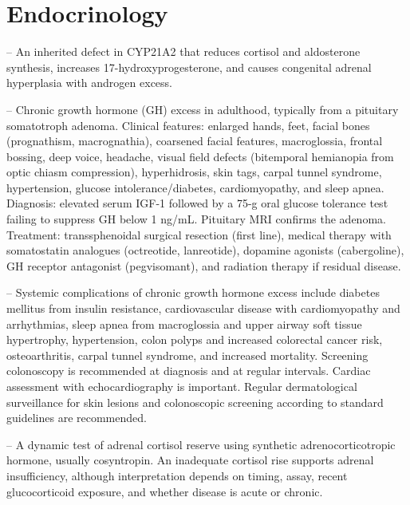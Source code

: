 \chapter{Endocrinology}

-- An inherited defect in CYP21A2 that reduces cortisol and aldosterone synthesis, increases 17-hydroxyprogesterone, and causes congenital adrenal hyperplasia with androgen excess.

-- Chronic growth hormone (GH) excess in adulthood, typically from a pituitary somatotroph adenoma. Clinical features: enlarged hands, feet, facial bones (prognathism, macrognathia), coarsened facial features, macroglossia, frontal bossing, deep voice, headache, visual field defects (bitemporal hemianopia from optic chiasm compression), hyperhidrosis, skin tags, carpal tunnel syndrome, hypertension, glucose intolerance/diabetes, cardiomyopathy, and sleep apnea. Diagnosis: elevated serum IGF-1 followed by a 75-g oral glucose tolerance test failing to suppress GH below 1 ng/mL. Pituitary MRI confirms the adenoma. Treatment: transsphenoidal surgical resection (first line), medical therapy with somatostatin analogues (octreotide, lanreotide), dopamine agonists (cabergoline), GH receptor antagonist (pegvisomant), and radiation therapy if residual disease.

-- Systemic complications of chronic growth hormone excess include diabetes mellitus from insulin resistance, cardiovascular disease with cardiomyopathy and arrhythmias, sleep apnea from macroglossia and upper airway soft tissue hypertrophy, hypertension, colon polyps and increased colorectal cancer risk, osteoarthritis, carpal tunnel syndrome, and increased mortality. Screening colonoscopy is recommended at diagnosis and at regular intervals. Cardiac assessment with echocardiography is important. Regular dermatological surveillance for skin lesions and colonoscopic screening according to standard guidelines are recommended.

-- A dynamic test of adrenal cortisol reserve using synthetic adrenocorticotropic hormone, usually cosyntropin. An inadequate cortisol rise supports adrenal insufficiency, although interpretation depends on timing, assay, recent glucocorticoid exposure, and whether disease is acute or chronic.

